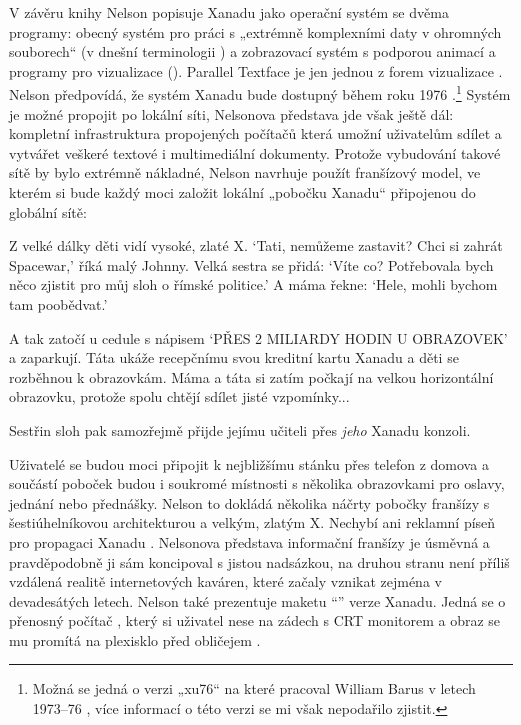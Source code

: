 \label{p:dm:xanadu}
V závěru knihy Nelson popisuje Xanadu jako operační systém se dvěma programy: obecný systém pro práci s „extrémně komplexními daty v ohromných souborech“ (v dnešní terminologii ) a zobrazovací systém s podporou animací a programy pro vizualizace (). Parallel Textface je jen jednou z forem vizualizace \autocite[DM57]{Nelson1974}. Nelson předpovídá, že systém Xanadu bude dostupný během roku 1976 \autocite[DM56--DM57]{Nelson1974}.\footnote{%
Možná se jedná o verzi „xu76“ na které pracoval William Barus v letech 1973--76 \autocite[26]{Nelson1999b}, více informací o této verzi se mi však nepodařilo zjistit.}
Systém je možné propojit po lokální síti, Nelsonova představa jde však ještě dál: kompletní infrastruktura propojených počítačů která umožní uživatelům sdílet a vytvářet veškeré textové i multimediální dokumenty. Protože vybudování takové sítě by bylo extrémně nákladné, Nelson navrhuje použít franšízový model, ve kterém si bude každý moci založit lokální „pobočku Xanadu“ připojenou do globální sítě:

\begin{quoted}{\autocite[DM57]{Nelson1974}}
Z velké dálky děti vidí vysoké, zlaté X. \enquote*{Tati, nemůžeme zastavit? Chci si zahrát Spacewar,} říká malý Johnny. Velká sestra se přidá: \enquote*{Víte co? Potřebovala bych něco zjistit pro můj sloh o římské politice.} A máma řekne: \enquote*{Hele, mohli bychom tam poobědvat.}

A tak zatočí u cedule s nápisem \enquote*{PŘES 2 MILIARDY HODIN U OBRAZOVEK} a zaparkují. Táta ukáže recepčnímu svou kreditní kartu Xanadu a děti se rozběhnou k obrazovkám. Máma a táta si zatím počkají na velkou horizontální obrazovku, protože spolu chtějí sdílet jisté vzpomínky...

Sestřin sloh pak samozřejmě přijde jejímu učiteli přes \emph{jeho} Xanadu konzoli.
\end{quoted}

Uživatelé se budou moci připojit k nejbližšímu stánku přes telefon z domova a součástí poboček budou i soukromé místnosti s několika obrazovkami pro oslavy, jednání nebo přednášky. Nelson to dokládá několika náčrty pobočky franšízy s šestiúhelníkovou architekturou a velkým, zlatým X. Nechybí ani reklamní píseň pro propagaci Xanadu \autocite[DM57]{Nelson1974}. Nelsonova představa informační franšízy je úsměvná a pravděpodobně ji sám koncipoval s jistou nadsázkou, na druhou stranu není příliš vzdálená realitě internetových kaváren, které začaly vznikat zejména v devadesátých letech. Nelson také prezentuje maketu \enquote{} verze Xanadu. Jedná se o přenosný počítač , který si uživatel nese na zádech s CRT monitorem a obraz se mu promítá na plexisklo před obličejem \autocites[DM57]{Nelson1974}{Nelson1998a}.

